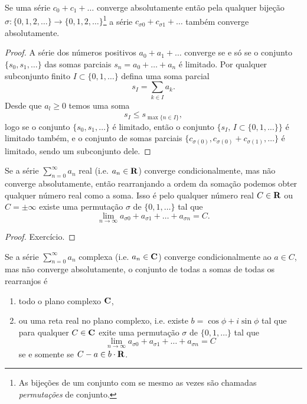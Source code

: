 \begin{lema}
\label{l:rearranjo-absoluto}
Se uma série $c_0 + c_1 + \dots$ converge absolutamente então pela qualquer
bijeção $\sigma: \{0,1,2,\dots\} \to \{0,1,2,\dots\}$\footnote{As bijeções
de um conjunto com se mesmo as vezes são chamadas \emph{permutações} de conjunto.}
a série $c_{\sigma 0} + c_{\sigma 1} + \dots$ também converge absolutamente.
\end{lema}
\begin{proof}
A série dos números positivos $a_0 + a_1 + \dots$ converge se e só se
o conjunto $\{s_0,s_1,\dots\}$ das somas parciais $s_n = a_0 + \dots + a_n$ é limitado.
Por qualquer subconjunto finito $I \subset \{0,1,\dots\}$
defina uma soma parcial
\[ s_I = \sum_{k\in I} a_k. \]
Desde que $a_l\geq 0$ temos uma soma
\[ s_I \leq s_{\max \{n\in I\}}, \]
logo se o conjunto $\{s_0,s_1,\dots\}$ é limitado,
então o conjunto $\{s_I,\,I\subset\{0,1,\dots \}\}$ é limitado também,
e o  conjunto de somas parciais $\{c_{\sigma(0)},c_{\sigma(0)} + c_{\sigma(1)},\dots\}$
é limitado, sendo um subconjunto dele.
\end{proof}

\begin{teorema}
\label{t:riemann-dini}
Se a série $\sum_{n=0}^\infty a_n$ real (i.e. $a_n\in\mathbf{R}$)
converge condicionalmente, mas não converge absolutamente,
então rearranjando a ordem da somação podemos obter
qualquer número real como a soma.
Isso é pelo qualquer número real $C\in\mathbf{R}$ ou $C = \pm \infty$
existe uma permutação $\sigma$ de $\{0,1,\dots\}$ tal que
\[ \lim_{n\to\infty} a_{\sigma 0} + a_{\sigma 1} + \dots + a_{\sigma n} = C. \]
\end{teorema}
\begin{proof}
Exercício.
\end{proof}

\begin{teorema}
\label{t:levy-steinitz}
Se a série $\sum_{n=0}^\infty a_n$ complexa (i.e. $a_n\in\mathbf{C}$)
converge condicionalmente ao $a\in C$, mas não converge absolutamente,
o conjunto de todas a somas de todas os rearranjos é
\begin{enumerate}
\item todo o plano complexo $\mathbf{C}$,
\item ou uma reta real no plano complexo, i.e. existe $b = \cos \phi + i \sin \phi$ tal que
para qualquer $C\in\mathbf{C}$ exite uma permutação $\sigma$ de $\{0,1,\dots\}$ tal que
\[ \lim_{n\to\infty} a_{\sigma 0} + a_{\sigma 1} + \dots + a_{\sigma n} = C \] 
se e somente se $C-a \in b \cdot \mathbf{R}$.
\end{enumerate}
\end{teorema}


